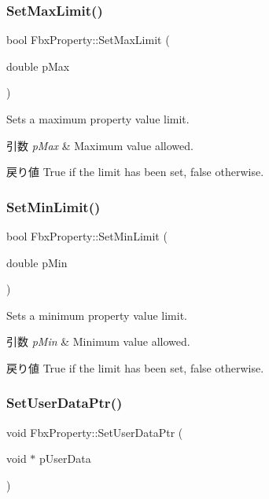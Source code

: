 \subsubsection{\texorpdfstring{Set\+Max\+Limit()}{SetMaxLimit()}}
{\footnotesize\ttfamily bool Fbx\+Property\+::\+Set\+Max\+Limit (\begin{DoxyParamCaption}\item[{double}]{p\+Max }\end{DoxyParamCaption})}

Sets a maximum property value limit. 
\begin{DoxyParams}{引数}
{\em p\+Max} & Maximum value allowed. \\
\hline
\end{DoxyParams}
\begin{DoxyReturn}{戻り値}
{\ttfamily True} if the limit has been set, {\ttfamily false} otherwise. 
\end{DoxyReturn}
\mbox{\label{class_fbx_property_aa257615c70fd0ff635471216d8aea3ca}} 
\subsubsection{\texorpdfstring{Set\+Min\+Limit()}{SetMinLimit()}}
{\footnotesize\ttfamily bool Fbx\+Property\+::\+Set\+Min\+Limit (\begin{DoxyParamCaption}\item[{double}]{p\+Min }\end{DoxyParamCaption})}

Sets a minimum property value limit. 
\begin{DoxyParams}{引数}
{\em p\+Min} & Minimum value allowed. \\
\hline
\end{DoxyParams}
\begin{DoxyReturn}{戻り値}
{\ttfamily True} if the limit has been set, {\ttfamily false} otherwise. 
\end{DoxyReturn}
\mbox{\label{class_fbx_property_a36506608b92abf21707be1c06a6cac3b}} 
\subsubsection{\texorpdfstring{Set\+User\+Data\+Ptr()}{SetUserDataPtr()}}
{\footnotesize\ttfamily void Fbx\+Property\+::\+Set\+User\+Data\+Ptr (\begin{DoxyParamCaption}\item[{void $\ast$}]{p\+User\+Data }\end{DoxyParamCaption})}

